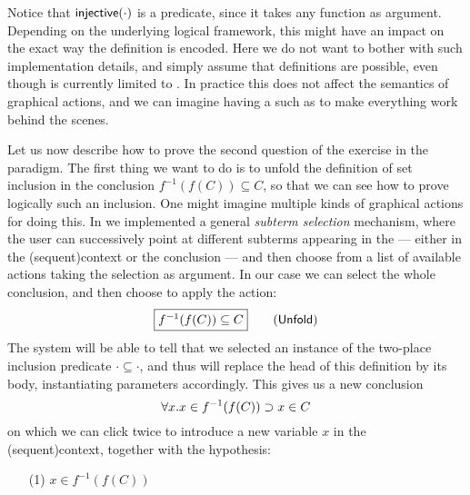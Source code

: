 Notice that $\mbox{\textsf{injective}}(\cdot)$ is a \emph{} predicate, since it
takes any function as argument. Depending on the underlying logical framework,
this might have an impact on the exact way the definition is encoded. Here we do
not want to bother with such implementation details, and simply assume that
 definitions are possible, even though  is currently limited
to . In practice this does not affect the semantics of
graphical actions, and we can imagine having a   such as
 to make everything work behind the scenes.

Let us now describe how to prove the second question of the exercise in the
 paradigm. The first thing we want to do is to unfold the
definition of set inclusion in the conclusion $f^{-1}(f(C)) \subseteq C$, so
that we can see how to prove logically such an inclusion. One might imagine
multiple kinds of graphical actions for doing this. In  we implemented a
general \emph{subterm selection} mechanism, where the user can successively
point at different subterms appearing in the  --- either in the \kl(sequent){context} or
the conclusion --- and then choose from a list of available actions taking the
selection as argument. In our case we can select the whole conclusion, and then
choose to apply the  action:
$$\fbox{$f^{-1}(f(C)) \subseteq C$} \qquad \text{(\textsf{Unfold})}$$
The system will be able to tell that we
selected an instance of the two-place inclusion predicate $\cdot \subseteq
\cdot$, and thus will replace the head of this definition by its body,
instantiating parameters accordingly. This gives us a new conclusion
$$\forall x. x \in f^{-1}(f(C)) \supset x \in C$$
on which we can click twice to introduce a new variable $x$ in the \kl(sequent){context},
together with the hypothesis:
\begin{itemize}
  \item[(1)] $x \in f^{-1}(f(C))$
\end{itemize}

